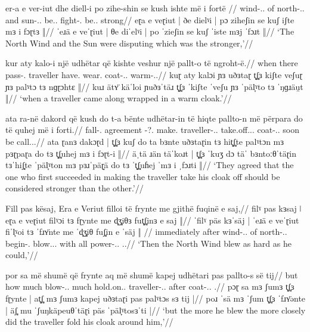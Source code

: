 \documentclass[a4paper,12pt]{article}
\newcommand{\gipa}{ɡ}
\begin{document}
\ex
\begingl
\gla er-a e ver-iut {} dhe diell-i {} po zihe-shin se kush ishte më i fortë {}//
\glgloss wind-{\Nom.\Sg.\Def} of north-{\Gen.\Sg.\Def} {} and sun-{\Nom.\Sg.\Def} {} be.{\Pst.\Tpl} fight-{\Pst.\Tpl} \Comp{} \Prn{} be.{\Pst.\Tsg} \Cmpr{} {} strong//
\glpm eɽa e veɽiut | ðe dielˠi | pɔ ziheʃin se kuʃ iʃte mɜ i fɔɽtɜ ‖//
\glph ˈeɹä e veˈɽiut | θe diˈelˠi | po ˈzieʃin se kuʃ ˈiste mɜj {} ˈfɔɹt ‖//
\glft  `The North Wind and the Sun were disputing which was the stronger,'//
\endgl
\xe

\ex
\begingl
\gla kur aty kalo-i një udhëtar që kishte veshur një pallt-o të ngroht-ë.//
\glgloss when there pass-{\Pst.\Tsg} {\Indf} traveller {\Rprn} have.{\Pst} wear.{\Ptcp} {\Indf} coat-{\Nom.\Sg.\Def} {\Inf} warm-{\Nom.\Sg.\Def}//
\glpm kuɽ aty kalɔi ɲɜ uðɜtaɽ t̻ʃ̻ɜ kiʃte veʃuɽ ɲɜ palˠtɔ tɜ n\gipa{}ɽɔhtɛ ‖//
\glph kuɹ ätʏ̈ käˈloi ɲuðɜˈtäɹ {} t̻ʃ̻ɜ ˈkiʃte ˈveʃu ɲɜ ˈpäl̞ˠto tɜ ˈŋ\gipa{}ɹäu̯t ‖//
\glft  `when a traveller came along wrapped in a warm cloak.'//
\endgl
\xe

\ex
\begingl
\gla ata ra-në dakord {} që kush do t-a bënte udhëtar-in të hiqte pallto-n më përpara do të quhej më i forti.//
\glgloss \Tpl{} fall-{\Pst.\Tpl} agreement {} \Comp{} \Prn{} \Fut{} \Fut{}-?.\Tsg{} make.\Pst{} traveller-{\Nom.\Sg.\Def} \Inf{} take.off.{\Sbjv.\Pst.\Tsg} coat-{\Acc.\Sg.\Def} \Cmpr{} soon \Fut{} be call.{\Ind.\Pst.\Tsg}//
\glpm ata ɽanɜ dakɔɽd | t̻ʃ̻ɜ  kuʃ do ta bɜnte uðɜtaɽin tɜ hit̻ʃ̻te palˠtɔn mɜ pɜɽpaɽa do tɜ t̻ʃ̻uhej mɜ i fɔɽt-i ‖//
\glph äˌtä ɹän täˈkoɹt | t̻ʃ̻ɜ ˈkuʒ dɔ täˈ bɜntoːθˈtäɽin tɜˈhiʃ̻te ˈpäl̞ˠton mɜ pɜɹˈpäɽ̞ä do tɜ ˈt̻ʃ̻uɦej ˈmɜ i ˌfɔɹti ‖//
\glft  `They agreed that the one who first succeeded in making the traveller take his cloak off should be considered stronger than the other.'//
\endgl
\xe

\ex
\begingl
\gla Fill pas kësaj, {} Era e Veriut filloi të frynte me gjithë fuqinë e saj,//
\glpm filˠ pas kɜsaj ǀ eɽa e veɽiut filˠɔi tɜ fɽynte me d̻ʒ̻iθɜ fut̻ʃ̻inɜ e saj ‖//
\glph ˈfilˠ päs kɜˈsäj | ˈeɹä e veˈɽiut fiˈl̞ˠoi tɜ ˈfɹʏ̈nte me ˈd̻ʒ̻iθ fuʃ̻in e ˈsäj ‖ //
\glgloss immediately after {\Dem} {} wind-{\Nom.\Sg.\Def} of north-{\Gen.\Sg.\Def} begin-{\Pst.\Tsg} {\Inf} blow.{\Sbjv.\Pst.\Tsg} with all power-{\Acc.\Sg.\Def} {\Tsg.\F.\Poss}//
\glft  `Then the North Wind blew as hard as he could,'//
\endgl
\xe

\ex
\begingl
\gla por sa më shumë që frynte {} aq më shumë kapej udhëtari pas pallto-s {së tij}//
\glgloss but how {\Cmpr} much {\Comp} blow-{\Pst.\Tsg.\Def} {} {\Comp} {\Cmpr} much hold.on.{\Impf.\Tsg} traveller-{\Nom.\Sg.\Def} after coat-{\Gen.\Sg.\Def} {\Tsg.\Poss}//
\glpm pɔɽ sa mɜ ʃumɜ t̻ʃ̻ɜ fɽynte | at̻ʃ̻ mɜ ʃumɜ kapej uðɜtaɽi pas palˠtɔs {sɜ tij} |//
\glph poɹ ˈsä mɜ ˈʃum t̻ʃ̻ɜ ˈfɹʏ̈ənte | äʃ̻ mu ˈʃuŋkäpeuθˈtäɽi {} {} päs ˈpäl̞ˠtosɜˈti {} |//
\glft  `but the more he blew the more closely did the traveller fold his cloak around him,'//
\endgl
\xe
\end{document}
